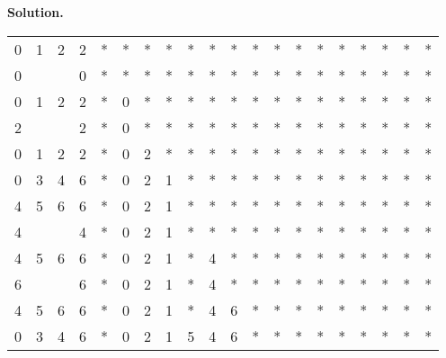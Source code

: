 \documentclass[12pt, a4paper]{article}
\newenvironment{sol}[1][Solution]
{\par\medskip\noindent \textbf{#1.} }
{\medskip}
\begin{document}
\begin{sol}
\begin{center}
\begin{tabular}{cccc|cccccccccccccccc}
				0 & 1 & 2 & 2 &
				* & * & * & * & * & * & * & * & * & * & * & * & * & * & * & * \\
				
				{\color{green}0} & {} & {} &0 &
				* & * & * & * & * & * & * & * & * & * & * & * & * & * & * & * \\
				
				0 & {\color{red}1} & 2 & 2 &
				* & {\color{green}0} & * & * & * & * & * & * & * & * & * & * & * & * & * & * \\
				
				{\color{green}2} & {} & {} & 2 &
				* & {\color{gray}0} & * & * & * & * & * & * & * & * & * & * & * & * & * & * \\
				
				0 & {\color{green}1} & {\color{red}2} & 2 &
				* & {\color{gray}0} & {\color{green}2} & * & * & * & * & * & * & * & * & * & * & * & * & * \\
				
				0 & {\color{red}3} & {\color{black}4} & 6 &
				* & {\color{gray}0} & {\color{gray}2} & {\color{green}1} & * & * & * & * & * & * & * & * & * & * & * & * \\
				
				4 & {\color{black}5} & {\color{black}6} & 6 &
				* & {\color{gray}0} & {\color{gray}2} & {\color{gray}1} & * & * & * & * & * & * & * & * & * & * & * & * \\
				
				{\color{green}4} & {} & {} & 4 &
				* & {\color{gray}0} & {\color{gray}2} & {\color{gray}1} & * & * & * & * & * & * & * & * & * & * & * & * \\
				
				{\color{green}4} & {\color{red}5} & {6} & 6 &
				* & {\color{gray}0} & {\color{gray}2} & {\color{gray}1} & * & {\color{green}4} & * & * & * & * & * & * & * & * & * & * \\
				
				{\color{green}6} & {} & {} & 6 &
				* & {\color{gray}0} & {\color{gray}2} & {\color{gray}1} & * & {\color{gray}4} & * & * & * & * & * & * & * & * & * & * \\
				
				{4} & {\color{green}5} & {\color{red}6} & 6 &
				* & {\color{gray}0} & {\color{gray}2} & {\color{gray}1} & * & {\color{gray}4} & {\color{green}6} & * & * & * & * & * & * & * & * & * \\
				
				{0} & {\color{green}3} & {\color{red}4} & 6 &
				* & {\color{gray}0} & {\color{gray}2} & {\color{gray}1} & {\color{green}5} & {\color{gray}4} & {\color{gray}6} & * & * & * & * & * & * & * & * & * \\
				

\end{tabular}
\end{center}
\end{sol}
\end{document}
